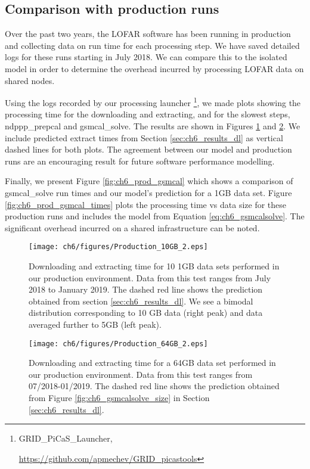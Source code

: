 \subsection{Comparison with production runs}
Over the past two years, the LOFAR software has been running in production and collecting data on run time for each processing step. We have saved detailed logs for these runs starting in July 2018.  We can compare this to the isolated model in order to determine the overhead incurred by processing LOFAR data on shared nodes. 

Using the logs recorded by our processing launcher \footnote{GRID\_PiCaS\_Launcher, \raggedright\url{https://github.com/apmechev/GRID\_picastools}}, we made plots showing the processing time for the downloading and extracting, and for the slowest steps, {\selectfont ndppp\_prepcal} and {\selectfont gsmcal\_solve}. 
The results are shown in Figures \ref{fig:ch6_prod_dl_10} and \ref{fig:ch6_prod_dl_64}. We include predicted extract times from Section \ref{sec:ch6_results_dl} as vertical dashed lines for both plots. The agreement between our model and production runs are an encouraging result for future software performance modelling. 

Finally, we present Figure \ref{fig:ch6_prod_gsmcal} which shows a comparison of {\selectfont gsmcal\_solve} run times and our model's prediction for a 1GB data set.  Figure \ref{fig:ch6_prod_gsmcal_times} plots the processing time vs data size for these production runs and includes the model from Equation \ref{eq:ch6_gsmcalsolve}. The significant overhead incurred on a shared infrastructure can be noted. 

\begin{figure}
    \texttt{[image: ch6/figures/Production\_10GB\_2.eps]}
      \caption{Downloading and extracting time for 10 1GB data sets performed in our production environment. Data from this test ranges from July 2018 to January 2019. The dashed red line shows the prediction obtained from section \ref{sec:ch6_results_dl}. We see a bimodal distribution corresponding to 10 GB data (right peak) and data averaged further to 5GB (left peak).}
	\label{fig:ch6_prod_dl_10}
\end{figure}


\begin{figure}
    \texttt{[image: ch6/figures/Production\_64GB\_2.eps]}
      \caption{Downloading and extracting time for a 64GB data set performed in our production environment. Data from this test ranges from 07/2018-01/2019. The dashed red line shows the prediction obtained from Figure \ref{fig:ch6_gsmcalsolve_size} in Section \ref{sec:ch6_results_dl}. }
	\label{fig:ch6_prod_dl_64}
\end{figure}


